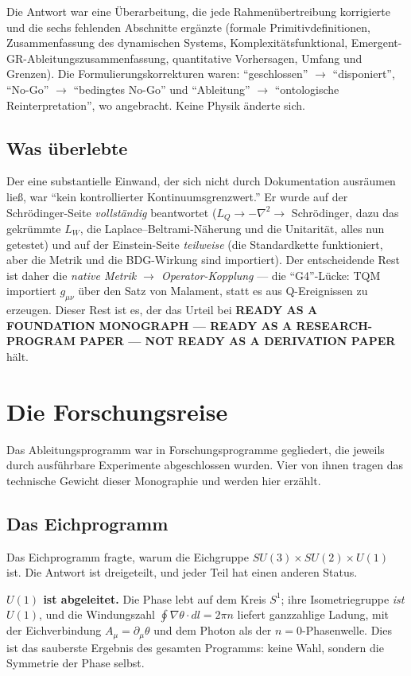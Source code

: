 \documentclass[10pt,twoside,openany]{book}
\begin{document}
Die Antwort war eine Überarbeitung, die jede Rahmenübertreibung korrigierte und die sechs
fehlenden Abschnitte ergänzte (formale Primitivdefinitionen, Zusammenfassung des
dynamischen Systems, Komplexitätsfunktional, Emergent-GR-Ableitungszusammenfassung,
quantitative Vorhersagen, Umfang und Grenzen). Die Formulierungskorrekturen waren:
``geschlossen'' $\to$ ``disponiert'', ``No-Go'' $\to$ ``bedingtes No-Go'' und
``Ableitung'' $\to$ ``ontologische Reinterpretation'', wo angebracht. Keine Physik änderte
sich.

\section{Was überlebte}

Der eine substantielle Einwand, der sich nicht durch Dokumentation ausräumen ließ, war
``kein kontrollierter Kontinuumsgrenzwert.'' Er wurde auf der Schr\"odinger-Seite
\emph{vollständig} beantwortet ($L_Q\to-\nabla^2\to$ Schr\"odinger, dazu das gekrümmte
$L_W$, die Laplace--Beltrami-Näherung und die Unitarität, alles nun getestet) und auf der
Einstein-Seite \emph{teilweise} (die Standardkette funktioniert, aber die Metrik und die
BDG-Wirkung sind importiert). Der entscheidende Rest ist daher die \emph{native Metrik
$\to$ Operator-Kopplung} --- die ``G4''-Lücke: TQM importiert $g_{\mu\nu}$ über den Satz
von Malament, statt es aus Q-Ereignissen zu erzeugen. Dieser Rest ist es, der das Urteil
bei \textbf{READY AS A FOUNDATION MONOGRAPH --- READY AS A RESEARCH-PROGRAM PAPER --- NOT
READY AS A DERIVATION PAPER} hält.

\chapter{Die Forschungsreise}
\label{ch:journey}

Das Ableitungsprogramm war in Forschungsprogramme gegliedert, die jeweils durch
ausführbare Experimente abgeschlossen wurden. Vier von ihnen tragen das technische
Gewicht dieser Monographie und werden hier erzählt.

\section{Das Eichprogramm}

Das Eichprogramm fragte, warum die Eichgruppe $SU(3)\times SU(2)\times U(1)$ ist. Die
Antwort ist dreigeteilt, und jeder Teil hat einen anderen Status.

\textbf{$U(1)$ ist abgeleitet.} Die Phase lebt auf dem Kreis $S^1$; ihre
Isometriegruppe \emph{ist} $U(1)$, und die Windungszahl
$\oint\nabla\theta\cdot dl=2\pi n$ liefert ganzzahlige Ladung, mit der Eichverbindung
$A_\mu=\partial_\mu\theta$ und dem Photon als der $n=0$-Phasenwelle. Dies ist das
sauberste Ergebnis des gesamten Programms: keine Wahl, sondern die Symmetrie der Phase
selbst.
\end{document}
